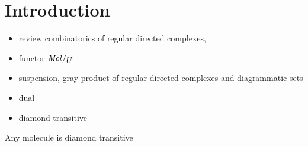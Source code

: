 \section*{Introduction}

\begin{itemize}
    \item review combinatorics of regular directed complexes, 
    \item functor \( \molecin{U} \)
    \item suspension, gray product of regular directed complexes and diagrammatic sets
    \item dual
    \item diamond transitive
\end{itemize}

\begin{lem} \label{lem:diamond_transitive}
    Any molecule is diamond transitive
\end{lem}